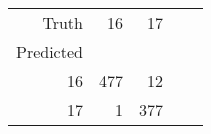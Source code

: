 \begin{table}[h]
\centering
\label{table:5}
\begin{tabular}{rrrrr}
\toprule
Truth & 16 & 17 \\
Predicted &  &  \\
\midrule
16 & 477 & 12 \\
17 & 1 & 377 \\
\bottomrule
\end{tabular}
\end{table}
